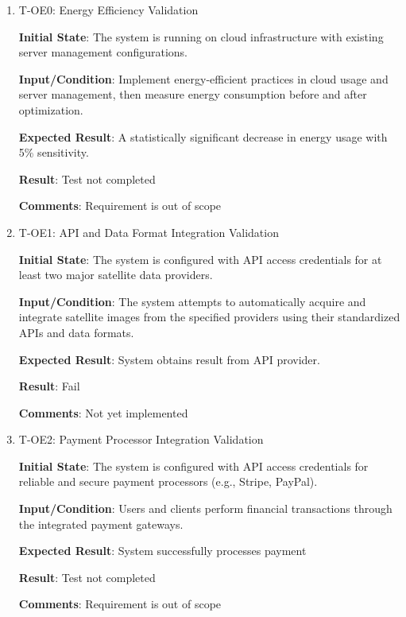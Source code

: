 \documentclass[12pt, titlepage]{article}
\begin{document}
\begin{enumerate}

    \item{T-OE0: Energy Efficiency Validation\\}
    
    
    \textbf{Initial State}: The system is running on cloud infrastructure with existing server management configurations.
    
    \textbf{Input/Condition}: Implement energy-efficient practices in cloud usage and server management, then measure energy consumption before and after optimization.
    
    \textbf{Expected Result}: A statistically significant decrease in energy usage with 5\% sensitivity.

    \textbf{Result}: Test not completed

    \textbf{Comments}: Requirement is out of scope
    
    
    \item{T-OE1: API and Data Format Integration Validation\\}
    
    
    \textbf{Initial State}: The system is configured with API access credentials for at least two major satellite data providers.
    
    \textbf{Input/Condition}: The system attempts to automatically acquire and integrate satellite images from the specified providers using their standardized APIs and data formats.
    
    \textbf{Expected Result}: System obtains result from API provider.

    \textbf{Result}: Fail

    \textbf{Comments}: Not yet implemented
    
    
    \item{T-OE2: Payment Processor Integration Validation\\}
    
    
    \textbf{Initial State}: The system is configured with API access credentials for reliable and secure payment processors (e.g., Stripe, PayPal).
    
    \textbf{Input/Condition}: Users and clients perform financial transactions through the integrated payment gateways.
    
    \textbf{Expected Result}: System successfully processes payment

    \textbf{Result}: Test not completed

    \textbf{Comments}: Requirement is out of scope
    

\end{enumerate}
\end{document}
